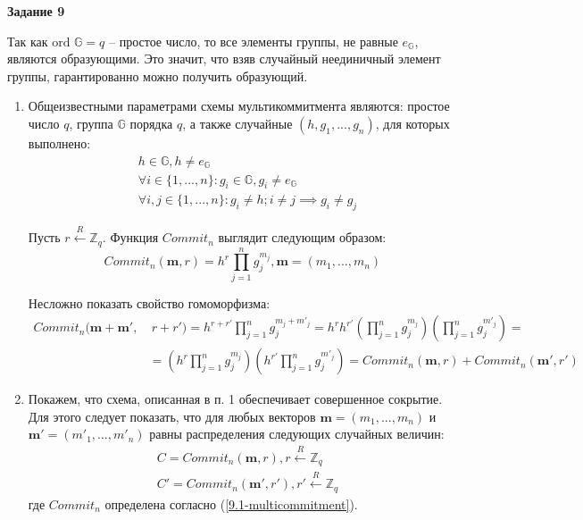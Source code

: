\documentclass[12pt, a4paper]{extarticle}
\newenvironment*{dummyenv}{}{}
\newcommand{\mysection}[1]{
    \addcontentsline{toc}{section}{#1}
    \begin{dummyenv}
        \bfseries\large #1
    \end{dummyenv}
}
\begin{document}
\mysection{Задание 9}

Так как $\text{ord }\mathbb{G} = q$ -- простое число, то все элементы группы, не равные $e_{\mathbb{G}}$, являются образующими.
Это значит, что взяв случайный неединичный элемент группы, гарантированно можно получить образующий.

\begin{enumerate}
    \item Общеизвестными параметрами схемы мультикоммитмента являются: простое число $q$, группа $\mathbb{G}$ порядка $q$, а 
        также случайные $(h, g_1, ..., g_n)$, для которых выполнено:
        \begin{equation*}
            \begin{split}
                & h \in \mathbb{G}, h \ne e_{\mathbb{G}} \\
                & \forall i \in \{1, ..., n\} : g_i \in \mathbb{G}, g_i \ne e_{\mathbb{G}} \\
                & \forall i, j \in \{1, ..., n\} : g_i \ne h; i \ne j \implies g_i \ne g_j
            \end{split}
        \end{equation*}
        
        Пусть $r \xleftarrow{R} \mathbb{Z}_q$. Функция $Commit_n$ выглядит следующим образом:
        \begin{equation}
            Commit_n(\mathbf{m}, r) = h^r \prod_{j = 1}^{n} g_j^{m_j}, \mathbf{m} = (m_1, ..., m_n)
            \label{9.1-multicommitment}
        \end{equation}
        
        Несложно показать свойство гомоморфизма:
        \begin{equation*}
            \begin{split}
                Commit_n(\mathbf{m} + \mathbf{m'}, &\ r + r') = h^{r + r'} \prod_{j = 1}^{n} g_j^{m_j + m'_j} = 
                    h^r h^{r'} \left(\prod_{j = 1}^{n} g_j^{m_j}\right) \left(\prod_{j = 1}^{n} g_j^{m'_j}\right) = \\
                & = \left(h^r \prod_{j = 1}^{n} g_j^{m_j}\right) \left(h^{r'} \prod_{j = 1}^{n} g_j^{m'_j}\right) =
                    Commit_n(\mathbf{m}, r) + Commit_n(\mathbf{m'}, r')
            \end{split}
        \end{equation*}
        
    \item Покажем, что схема, описанная в п. 1 обеспечивает совершенное сокрытие. Для этого следует показать, что
        для любых векторов $\mathbf{m} = (m_1, ..., m_n)$ и $\mathbf{m'} = (m'_1, ..., m'_n)$ равны распределения
        следующих случайных величин:
        \begin{equation*}
            \begin{split}
                & C  = Commit_n(\mathbf{m},  r),  r  \xleftarrow{R} \mathbb{Z}_q \\
                & C' = Commit_n(\mathbf{m'}, r'), r' \xleftarrow{R} \mathbb{Z}_q
            \end{split}
        \end{equation*}
        где $Commit_n$ определена согласно (\ref{9.1-multicommitment}).
        

\end{enumerate}
\end{document}
